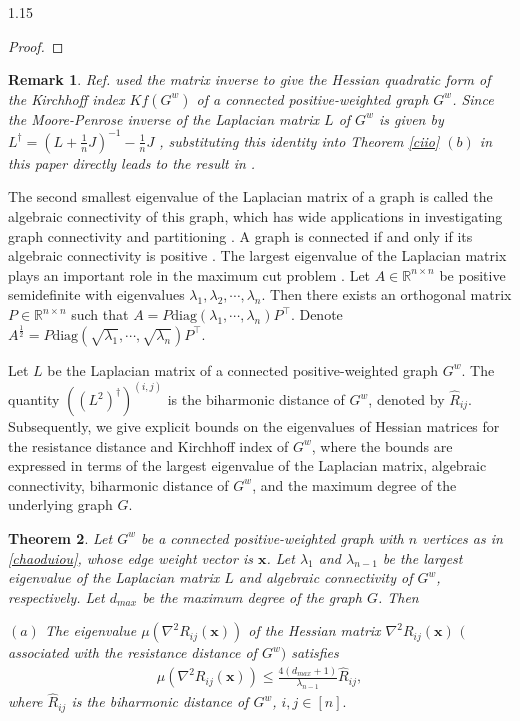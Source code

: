 \documentclass[preprint,12pt]{elsarticle1}
\newtheorem{thm}{Theorem}[section]
\newtheorem{rmk}[thm]{Remark}
\numberwithin{equation}{section}
\begin{document}
\begin{spacing}{1.15}
\begin{proof}
\end{proof}
\begin{rmk}Ref. \cite{ghosh2008minimizing} used the matrix inverse to give the Hessian quadratic form of the Kirchhoff index $Kf(G^{w})$  of a connected  positive-weighted graph $G^{w}$. Since the Moore-Penrose inverse of the Laplacian matrix $L$ of $G^{w}$ is given by $L^{\dag}=(L+\frac{1}{n}J)^{-1}-\frac{1}{n}J$ \cite{bapat2004resistance},
 substituting this identity  into Theorem \ref{ciio}
$(b)$ in this paper directly leads to the result in \cite{ghosh2008minimizing}.
\end{rmk}
The second smallest eigenvalue of the Laplacian
matrix of a graph is called the algebraic
connectivity of this graph, which
has wide applications in investigating graph connectivity
and partitioning  \cite{chung1997spectral}. A graph is connected if and only if its algebraic connectivity is positive \cite{fiedler1973algebraic}. The largest eigenvalue of the Laplacian matrix plays an important role in the maximum cut problem \cite{mohar1990eigenvalues}.
Let $A\in \mathbb{R}^{n\times n}$
be positive semidefinite with
eigenvalues $\lambda_{1},\lambda_{2},\cdots,\lambda_{n}$. Then there exists an orthogonal matrix $P\in \mathbb{R}^{n\times n}$ such that $A=P\textrm{diag}(\lambda_{1},\cdots,\lambda_{n})P^{\top}$. Denote $A^{\frac{1}{2}}=P\textrm{diag}(\sqrt{\lambda_{1}},\cdots,
\sqrt{\lambda_{n}})P^{\top}.$

Let $L$ be the Laplacian matrix of a connected  positive-weighted graph $G^{w}$. The quantity $((L^{2})^{\dag})^{(i,j)}$ is the biharmonic distance of $G^{w}$\cite{lipman2010biharmonic}, denoted by $\widehat{R}_{ij}$. Subsequently, we give explicit  bounds on the eigenvalues of Hessian matrices for the resistance distance and Kirchhoff index of $G^{w}$, where the bounds are
 expressed in terms of the largest eigenvalue of the Laplacian matrix, algebraic connectivity, biharmonic distance of $G^{w}$, and the maximum degree of the underlying graph $G$.

\begin{thm}\label{thm4}
Let $G^{w}$ be a connected  positive-weighted graph with $n$ vertices as in \eqref{chaoduiou}, whose edge weight vector is $\mathbf{x}$. Let $\lambda_{1}$ and $\lambda_{n-1}$ be the largest eigenvalue of the Laplacian matrix $L$ and  algebraic connectivity  of $G^{w}$, respectively. Let $d_{max}$ be the maximum degree of the graph $G$. Then

$(a)$ The eigenvalue $\mu(\nabla^{2}R_{ij}(\mathbf{x}))$ of the Hessian matrix $\nabla^{2}R_{ij}(\mathbf{x})$ $($associated with  the resistance distance of $G^{w}$$)$ satisfies
\begin{align}
\nonumber \mu(\nabla^{2}R_{ij}(\mathbf{x}))\leq \frac{4(d_{max}+1)}{\lambda_{n-1}}\widehat{R}_{ij},\end{align}
where $\widehat{R}_{ij}$ is the biharmonic distance of $G^{w}$, $i,j\in[n].$


\end{thm}
\end{spacing}
\end{document}
